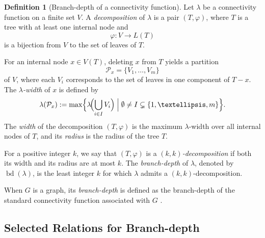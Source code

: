 \documentclass[10pt]{book}
\theoremstyle{definition}
\newtheorem{definition}[theorem]{Definition}
\let\phi=\varphi
\begin{document}
\begin{definition}[Branch-depth of a connectivity function]
\cite{91}
Let \(\lambda\) be a connectivity function on a finite set \(V\).  
A \emph{decomposition} of \(\lambda\) is a pair \((T,\phi)\), where \(T\) is a tree with at least one internal node and
\[
\phi:V \to L(T)
\]
is a bijection from \(V\) to the set of leaves of \(T\).

For an internal node \(x\in V(T)\), deleting \(x\) from \(T\) yields a partition
\[
\mathcal{P}_x=\{V_1,\dots,V_m\}
\]
of \(V\), where each \(V_i\) corresponds to the set of leaves in one component of \(T-x\).  
The \emph{\(\lambda\)-width} of \(x\) is defined by
\[
\lambda(\mathcal{P}_x)
:=
\max\Bigl\{
\lambda\!\Bigl(\bigcup_{i\in I} V_i\Bigr)
\;\Big|\;
\emptyset \neq I \subsetneq \{1,\dots,m\}
\Bigr\}.
\]
The \emph{width} of the decomposition \((T,\phi)\) is the maximum \(\lambda\)-width over all internal nodes of \(T\), and its \emph{radius} is the radius of the tree \(T\).

For a positive integer \(k\), we say that \((T,\phi)\) is a \emph{\((k,k)\)-decomposition} if both its width and its radius are at most \(k\).  
The \emph{branch-depth} of \(\lambda\), denoted by \(\operatorname{bd}(\lambda)\), is the least integer \(k\) for which \(\lambda\) admits a \((k,k)\)-decomposition.
\end{definition}

When \(G\) is a graph, its \emph{branch-depth} is defined as the branch-depth of the standard connectivity function associated with \(G\) \cite{91}.

\subsection{Selected Relations for Branch-depth}
\end{document}
